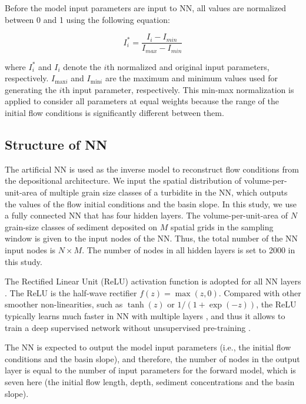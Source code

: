 Before the model input parameters are input to NN, all values are normalized between 0 and 1 using the following equation:

\begin{equation}
I_{i}^{*} = \frac{I_i - I_{min}}{I_{max} - I_{min}}
\label{eq:normalization}
\end{equation}

\noindent where $I_i^*$ and $I_i$ denote the $i$th normalized and original input parameters, respectively. $I_{\mathrm{max}i}$ and $I_{\mathrm{min}i}$ are the maximum and minimum values used for generating the $i$th input parameter, respectively. This min-max normalization is applied to consider all parameters at equal weights because the range of the initial flow conditions is significantly different between them.

\subsection{Structure of NN}
The artificial NN is used as the inverse model to reconstruct flow conditions from the depositional architecture. We input the spatial distribution of volume-per-unit-area of multiple grain size classes of a turbidite in the NN, which outputs the values of the flow initial conditions and the basin slope. In this study, we use a fully connected NN that has four hidden layers. The volume-per-unit-area of $N$ grain-size classes of sediment deposited on $M$ spatial grids in the sampling window is given to the input nodes of the NN. Thus, the total number of the NN input nodes is $N \times M$. The number of nodes in all hidden layers is set to 2000 in this study. 

The Rectified Linear Unit (ReLU) activation function is adopted for all NN layers \citep{Nair2010, Glorot2011}. The ReLU is the half-wave rectifier $f(z) = \max(z, 0)$. Compared with other smoother non-linearities, such as $\tanh(z)$ or $1/(1+\exp(-z))$, the ReLU typically learns much faster in NN with multiple layers \citep{Glorot2011}, and thus it allows to train a deep supervised network without unsupervised pre-training \citep{LeCun2015}.

The NN is expected to output the model input parameters (i.e., the initial flow conditions and the basin slope), and therefore, the number of nodes in the output layer is equal to the number of input parameters for the forward model, which is seven here (the initial flow length, depth, sediment concentrations and the basin slope).


